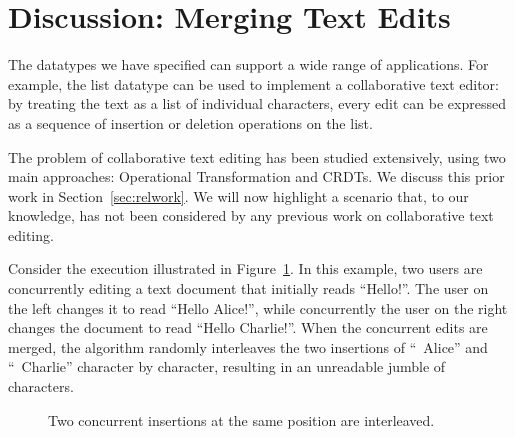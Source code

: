 \section{Discussion: Merging Text Edits}\label{sec:bad-merge}

The datatypes we have specified can support a wide range of applications.
For example, the list datatype can be used to implement a collaborative text editor: by treating the text as a list of individual characters, every edit can be expressed as a sequence of insertion or deletion operations on the list.

The problem of collaborative text editing has been studied extensively, using two main approaches: Operational Transformation and CRDTs.
We discuss this prior work in Section~\ref{sec:relwork}.
We will now highlight a scenario that, to our knowledge, has not been considered by any previous work on collaborative text editing.

Consider the execution illustrated in Figure~\ref{fig:bad-merge}.
In this example, two users are concurrently editing a text document that initially reads ``Hello!''.
The user on the left changes it to read ``Hello Alice!'', while concurrently the user on the right changes the document to read ``Hello Charlie!''.
When the concurrent edits are merged, the algorithm randomly interleaves the two insertions of ``~Alice'' and ``~Charlie'' character by character, resulting in an unreadable jumble of characters.

\begin{figure}
\centering
{}
\caption{Two concurrent insertions at the same position are interleaved.}\label{fig:bad-merge}
\end{figure}

